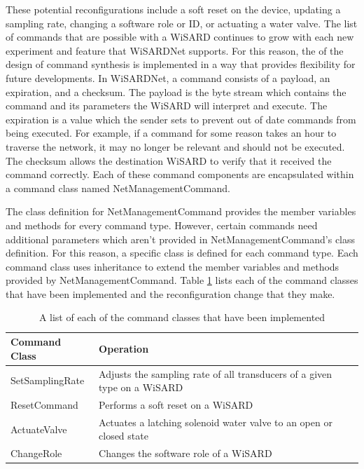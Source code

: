 These potential reconfigurations include a soft reset on the device, updating a sampling rate, changing a software role or ID, or actuating a water valve. The list of commands that are possible with a WiSARD continues to grow with each new experiment and feature that WiSARDNet supports. For this reason, the of the design of command synthesis is implemented in a way that provides flexibility for future developments. In WiSARDNet, a command consists of a payload, an expiration, and a checksum. The payload is the byte stream which contains the command and its parameters the WiSARD will interpret and execute. The expiration is a value which the sender sets to prevent out of date commands from being executed. For example, if a command for some reason takes an hour to traverse the network, it may no longer be relevant and should not be executed. The checksum allows the destination WiSARD to verify that it received the command correctly. Each of these command components are encapsulated within a command class named NetManagementCommand.

The class definition for NetManagementCommand provides the member variables and methods for every command type. However, certain commands need additional parameters which aren't provided in NetManagementCommand's class definition. For this reason, a specific class is defined for each command type. Each command class uses inheritance to extend the member variables and methods provided by NetManagementCommand. Table \ref{tab:commands} lists each of the command classes that have been implemented and the reconfiguration change that they make.\\

\begin{table}[H]
	\centering
	\renewcommand{\arraystretch}{1.1}
	\begin{tabular}{|p{3cm}|p{11cm}|}
	\hline
	Command Class & Operation\\
	\hline
	SetSamplingRate & Adjusts the sampling rate of all transducers of a given type on a WiSARD\\
	\hline
	ResetCommand & Performs a soft reset on a WiSARD\\
	\hline
	ActuateValve & Actuates a latching solenoid water valve to an open or closed state\\
	\hline
	ChangeRole & Changes the software role of a WiSARD \\
	\hline
	\end{tabular}
	\caption{A list of each of the command classes that have been implemented}
	\label{tab:commands}
\end{table}

